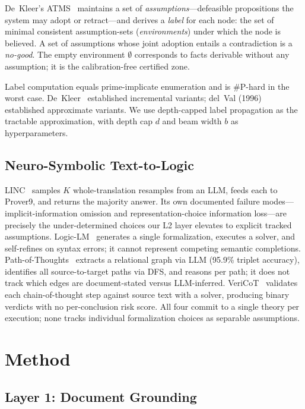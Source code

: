 \documentclass[11pt,letterpaper]{article}
\begin{document}
De~Kleer's ATMS~\citep{deKleer1986} maintains a set of \emph{assumptions}---defeasible propositions the
system may adopt or retract---and derives a \emph{label} for each node: the set of minimal consistent
assumption-sets (\emph{environments}) under which the node is believed. A set of assumptions whose joint
adoption entails a contradiction is a \emph{no-good}. The empty environment $\emptyset$ corresponds to
facts derivable without any assumption; it is the calibration-free certified zone.

Label computation equals prime-implicate enumeration and is \#P-hard in the worst case.
De~Kleer~\citep{deKleer1992} established incremental variants; del~Val (1996) established approximate
variants. We use depth-capped label propagation as the tractable approximation, with depth cap $d$ and
beam width $b$ as hyperparameters.

\subsection{Neuro-Symbolic Text-to-Logic}

LINC~\citep{Olausson2023} samples $K$ whole-translation resamples from an LLM, feeds each to Prover9,
and returns the majority answer. Its own documented failure modes---implicit-information omission and
representation-choice information loss---are precisely the under-determined choices our L2 layer elevates
to explicit tracked assumptions. Logic-LM~\citep{Pan2023} generates a single formalization, executes a
solver, and self-refines on syntax errors; it cannot represent competing semantic completions.
Path-of-Thoughts~\citep{Zhang2024} extracts a relational graph via LLM (95.9\% triplet accuracy),
identifies all source-to-target paths via DFS, and reasons per path; it does not track which edges are
document-stated versus LLM-inferred. VeriCoT~\citep{Feng2025} validates each chain-of-thought step
against source text with a solver, producing binary verdicts with no per-conclusion risk score. All four
commit to a single theory per execution; none tracks individual formalization choices as separable
assumptions.

\section{Method}
\label{sec:method}

\subsection{Layer 1: Document Grounding}
\end{document}
